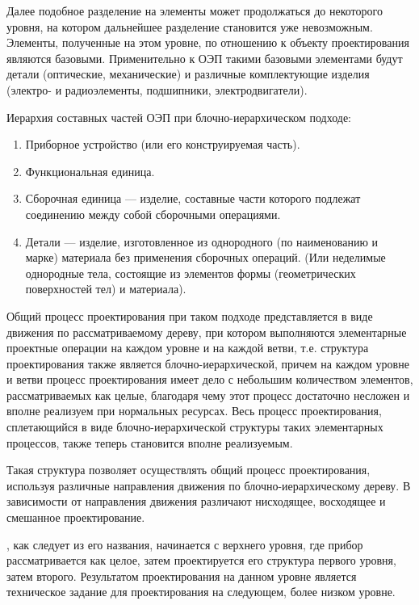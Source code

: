 Далее подобное разделение на элементы может продолжаться до некоторого уровня, на котором дальнейшее разделение становится уже невозможным. Элементы, полученные на этом уровне, по отношению к объекту проектирования являются базовыми. Применительно к ОЭП такими базовыми элементами будут детали (оптические, механические) и различные комплектующие изделия (электро- и радиоэлементы, подшипники, электродвигатели).

Иерархия составных частей ОЭП при блочно-иерархическом подходе:
\begin{enumerate}
	\item Приборное устройство (или его конструируемая часть).
	\item Функциональная единица.
	\item Сборочная единица --- изделие, составные части которого подлежат соединению между собой сборочными операциями.
	\item Детали --- изделие, изготовленное из однородного (по наименованию и марке) материала без применения сборочных операций. (Или неделимые однородные тела, состоящие из элементов формы (геометрических поверхностей тел) и материала).
\end{enumerate}

Общий процесс проектирования при таком подходе представляется в виде движения по рассматриваемому дереву, при котором выполняются элементарные проектные операции на каждом уровне и на каждой ветви, т.е. структура проектирования также является блочно-иерархической, причем на каждом уровне и ветви процесс проектирования имеет дело с небольшим количеством элементов, рассматриваемых как целые, благодаря чему этот процесс достаточно несложен и вполне реализуем при нормальных ресурсах. Весь процесс проектирования, сплетающийся в виде блочно-иерархической структуры таких элементарных процессов, также теперь становится вполне реализуемым.

Такая структура позволяет осуществлять общий процесс проектирования, используя различные направления движения по блочно-иерархическому дереву. В зависимости от направления движения различают нисходящее, восходящее и смешанное проектирование.

, как следует из его названия, начинается с верхнего уровня, где прибор рассматривается как целое, затем проектируется его структура первого уровня, затем второго. Результатом проектирования на данном уровне является техническое задание для проектирования на следующем, более низком уровне.

